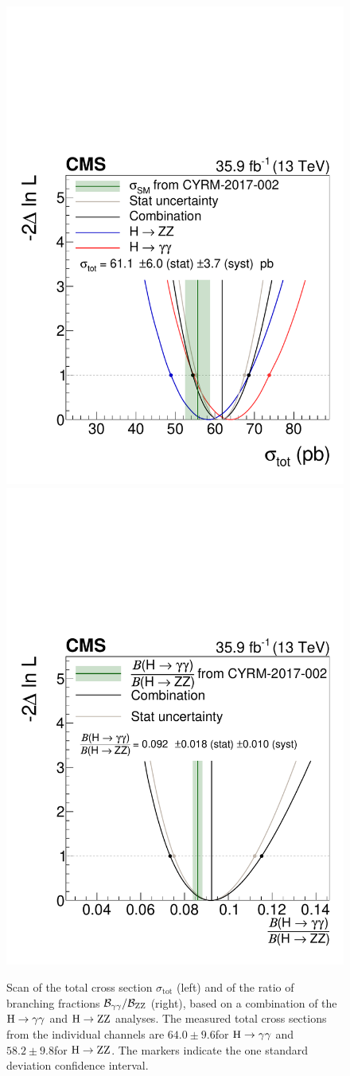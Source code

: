 \begin{figure}[hbtp]
  \begin{center}
    \includegraphics[width=0.49\linewidth]{img/differentials/scans_totalXS.pdf}
    \includegraphics[width=0.49\linewidth]{img/differentials/scans_ratioOfBRs.pdf}
    \caption{
        Scan of the total cross section $\sigma_\text{tot}$ (left) and of the ratio of branching fractions $\mathcal{B}_{\mathrm{\gamma}\mathrm{\gamma}}/\mathcal{B}_{\mathrm{Z}\mathrm{Z}}$ (right), based on a combination of the $\mathrm{H}\to\mathrm{\gamma}\mathrm{\gamma}$ and $\mathrm{H}\to\mathrm{Z}\mathrm{Z}$ analyses.
        The measured total cross sections from the individual channels are $64.0\pm9.6$\pb for $\mathrm{H}\to\mathrm{\gamma}\mathrm{\gamma}$ and $58.2\pm9.8$\pb for $\mathrm{H}\to\mathrm{Z}\mathrm{Z}$.
        The markers indicate the one standard deviation confidence interval.
        }
    \label{fig:RatioOfbrsAndTotalXSscan}
  \end{center}
\end{figure}



